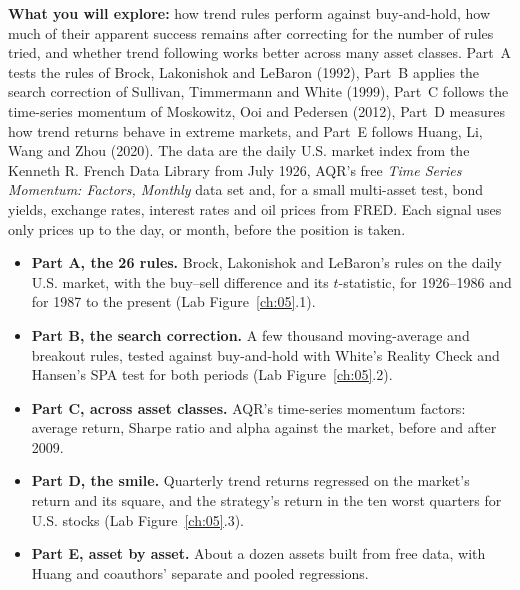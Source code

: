 \textbf{What you will explore:} how trend rules perform against buy-and-hold, how much of their apparent success remains after correcting for the number of rules tried, and whether trend following works better across many asset classes. Part~A tests the rules of Brock, Lakonishok and LeBaron (1992), Part~B applies the search correction of Sullivan, Timmermann and White (1999), Part~C follows the time-series momentum of Moskowitz, Ooi and Pedersen (2012), Part~D measures how trend returns behave in extreme markets, and Part~E follows Huang, Li, Wang and Zhou (2020). The data are the daily U.S. market index from the Kenneth R. French Data Library from July 1926, AQR's free \emph{Time Series Momentum: Factors, Monthly} data set and, for a small multi-asset test, bond yields, exchange rates, interest rates and oil prices from FRED. Each signal uses only prices up to the day, or month, before the position is taken.

\begin{itemize}
  \item \textbf{Part A, the 26 rules.} Brock, Lakonishok and LeBaron's rules on the daily U.S. market, with the buy--sell difference and its $t$-statistic, for 1926--1986 and for 1987 to the present (Lab Figure~\ref{ch:05}.1).
  \item \textbf{Part B, the search correction.} A few thousand moving-average and breakout rules, tested against buy-and-hold with White's Reality Check and Hansen's SPA test for both periods (Lab Figure~\ref{ch:05}.2).
  \item \textbf{Part C, across asset classes.} AQR's time-series momentum factors: average return, Sharpe ratio and alpha against the market, before and after 2009.
  \item \textbf{Part D, the smile.} Quarterly trend returns regressed on the market's return and its square, and the strategy's return in the ten worst quarters for U.S. stocks (Lab Figure~\ref{ch:05}.3).
  \item \textbf{Part E, asset by asset.} About a dozen assets built from free data, with Huang and coauthors' separate and pooled regressions.
\end{itemize}


